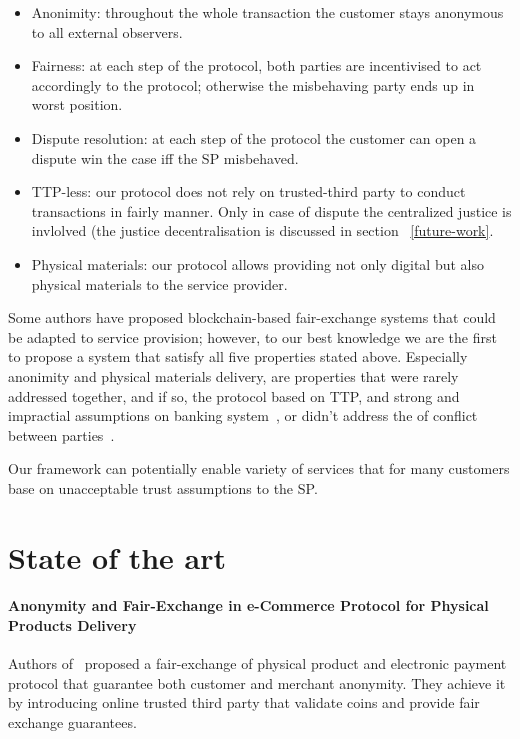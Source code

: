 \documentclass{ieeeaccess}
\begin{document}
\begin{itemize}
\item Anonimity:
throughout the whole transaction the customer stays anonymous to all external observers.
\item Fairness:
at each step of the protocol, both parties are incentivised to act accordingly to the protocol; otherwise the misbehaving party ends up in worst position.
\item Dispute resolution: at each step of the protocol the customer can open a dispute win the case iff the SP misbehaved.
\item TTP-less: our protocol does not rely on trusted-third party to conduct transactions in fairly manner. Only in case of dispute the centralized justice is invlolved (the justice decentralisation is discussed in section ~\ref{future-work}.
\item Physical materials: our protocol allows providing not only
  digital but also physical materials to the service provider.
\end{itemize}

Some authors have proposed blockchain-based fair-exchange systems that
could be adapted to service provision; however, to our best knowledge we
are the first to propose a system that satisfy all five properties
stated above. Especially anonimity and physical materials delivery, are
properties that were rarely addressed together, and if so, the protocol
based on TTP, and strong and impractial assumptions on banking system~\cite{birjoveanu2015anonymity}, or didn't address the of conflict
between parties~\cite{altawy2017lelantos}.

Our framework can potentially enable variety of services that for many
customers base on unacceptable trust assumptions to the SP.


\section{State of the art}\label{state-of-the-art}

\paragraph{Anonymity and Fair-Exchange in e-Commerce Protocol for
Physical Products
Delivery}\label{anonymity-and-fair-exchange-in-e-commerce-protocol-for-physical-products-delivery}

Authors of~\cite{birjoveanu2015anonymity} proposed a
fair-exchange of physical product and electronic payment protocol that
guarantee both customer and merchant anonymity. They achieve it by
introducing online trusted third party that validate coins and provide
fair exchange guarantees.
\end{document}
